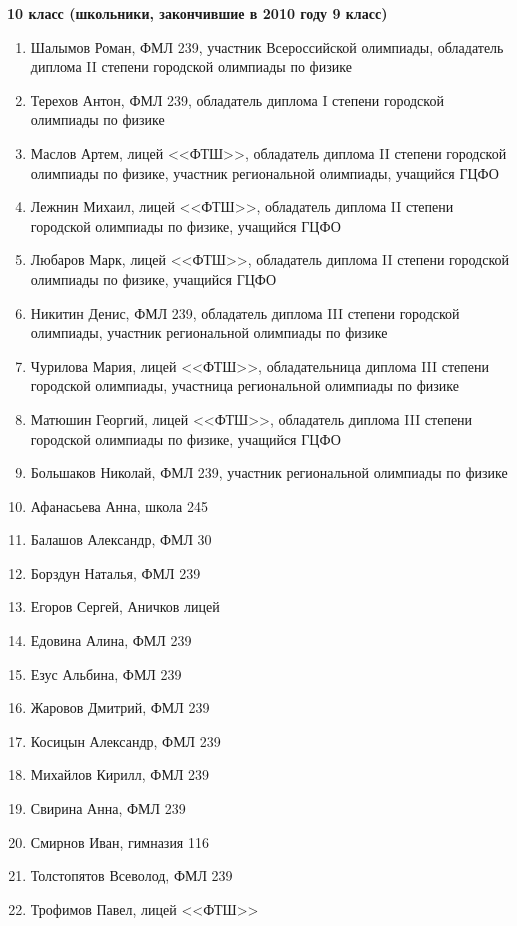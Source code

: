 \textbf{10 класс (школьники, закончившие в 2010 году 9 класс)}
\begin{enumerate}
\item Шалымов Роман, ФМЛ 239, участник Всероссийской олимпиады, обладатель диплома II степени городской олимпиады по физике
\item Терехов Антон, ФМЛ 239, обладатель диплома I степени городской олимпиады по физике
\item Маслов Артем, лицей <<ФТШ>>, обладатель диплома II степени
  городской олимпиады по физике, участник региональной олимпиады,
  учащийся ГЦФО
\item Лежнин Михаил, лицей <<ФТШ>>, обладатель диплома II степени
  городской олимпиады по физике, учащийся ГЦФО
\item Любаров Марк, лицей <<ФТШ>>, обладатель диплома II степени
  городской олимпиады по физике, учащийся ГЦФО
\item Никитин Денис, ФМЛ 239, обладатель диплома III степени городской олимпиады, участник региональной олимпиады по физике
\item Чурилова Мария, лицей <<ФТШ>>, обладательница диплома III степени городской олимпиады, участница региональной олимпиады по физике
\item Матюшин Георгий, лицей <<ФТШ>>, обладатель диплома III степени
  городской олимпиады по физике, учащийся ГЦФО
\item Большаков Николай, ФМЛ 239, участник региональной олимпиады по физике
\item Афанасьева Анна, школа 245
\item Балашов Александр, ФМЛ 30
\item Борздун Наталья, ФМЛ 239
\item Егоров Сергей, Аничков лицей
\item Едовина Алина, ФМЛ 239
\item Езус Альбина, ФМЛ 239
\item Жаровов Дмитрий, ФМЛ 239
\item Косицын Александр, ФМЛ 239
\item Михайлов Кирилл, ФМЛ 239
\item Свирина Анна, ФМЛ 239
\item Смирнов Иван, гимназия 116
\item Толстопятов Всеволод, ФМЛ 239
\item Трофимов Павел, лицей <<ФТШ>>
\end{enumerate}
